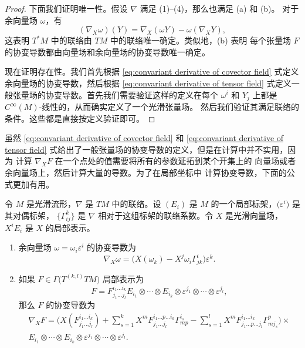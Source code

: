 \begin{proof}
  下面我们证明唯一性。假设 $\nabla$ 满足 (1)--(4)，那么也满足 (a) 和 (b)。
  对于余向量场 $\omega$，有
  \begin{equation}\label{eq:convariant derivative of covector field}
    (\nabla_X\omega)(Y)=\nabla_X(\omega Y)-\omega(\nabla_XY),
  \end{equation}
  这表明 $T^*M$ 中的联络由 $TM$ 中的联络唯一确定。类似地，(b) 表明
  每个张量场 $F$ 的协变导数都由向量场和余向量场的协变导数唯一确定。

  现在证明存在性。我们首先根据 \eqref{eq:convariant derivative of covector field}
  式定义余向量场的协变导数，然后根据 \eqref{eq:convariant derivative of tensor field} 
  式定义一般张量场的协变导数。首先我们需要验证这样的定义在每个 $\omega^i$
  和 $Y_j$ 上都是 $C^\infty(M)$-线性的，从而确实定义了一个光滑张量场。
  然后我们验证其满足联络的条件。这些都是直接按定义验证即可。
\end{proof}

虽然 \eqref{eq:convariant derivative of covector field} 和 \eqref{eq:convariant derivative of tensor field}
式给出了一般张量场的协变导数的定义，但是在计算中并不实用，因为
计算 $\nabla_XF$ 在一个点处的值需要将所有的参数延拓到某个开集上的
向量场或者余向量场上，然后计算大量的导数。为了在局部坐标中
计算协变导数，下面的公式更加有用。

\begin{proposition}
  令 $M$ 是光滑流形，$\nabla$ 是 $TM$ 中的联络。设 $(E_i)$
  是 $M$ 的一个局部标架，$\bigl(\varepsilon^i\bigr)$ 是其对偶标架，
  $\{\Gamma_{ij}^k\}$ 是 $\nabla$ 相对于这组标架的联络系数。令 $X$
  是光滑向量场，$X^iE_i$ 是 $X$ 的局部表示。
  \begin{enumerate}
    \item 余向量场 $\omega=\omega_i\varepsilon^i$ 的协变导数为
    \[
      \nabla_X\omega=\bigl(X(\omega_k)-X^j\omega_i\Gamma_{jk}^i\bigr)  \varepsilon^k.
    \]
    \item 如果 $F\in\Gamma\bigl(T^{(k,l)}TM\bigr)$ 局部表示为
    \[
      F=F^{i_1\dots i_k}_{j_1\dots j_l}E_{i_1}\otimes
      \cdots\otimes E_{i_k}\otimes\varepsilon^{j_1}\otimes\cdots\otimes\varepsilon^{j_l},
    \]
    那么 $F$ 的协变导数为
    \begin{multline*}
      \nabla_XF=\biggl(X\left(F^{i_1\dots i_k}_{j_1\dots j_l}\right)+
      \sum_{s=1}^kX^m F^{i_1\dots p\dots i_k}_{j_1\dots j_l}\Gamma_{mp}^{i_s}-
      \sum_{s=1}^lX^mF^{i_1\dots i_k}_{j_1\dots p\dots j_l}\Gamma_{mj_s}^p\biggr)\times\\
      E_{i_1}\otimes
      \cdots\otimes E_{i_k}\otimes\varepsilon^{j_1}\otimes\cdots\otimes\varepsilon^{j_l}.
    \end{multline*}
  \end{enumerate}
\end{proposition}

